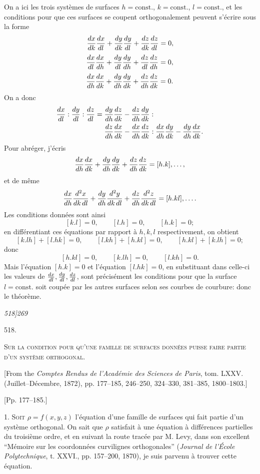 \documentclass[11pt]{article}
\newcommand{\phead}[3]{\noindent\textit{#1\hfill #2\hfill #3}\par\medskip}
\begin{document}
On a ici les trois syst\`emes de surfaces $h=\mathrm{const.}$, $k=\mathrm{const.}$,
$l=\mathrm{const.}$, et les conditions pour que ces surfaces se coupent orthogonalement
peuvent s'\'ecrire sous la forme
\[
{dx\over dk}{dx\over dl}+{dy\over dk}{dy\over dl}+{dz\over dk}{dz\over dl}=0,
\]
\[
{dx\over dl}{dx\over dh}+{dy\over dl}{dy\over dh}+{dz\over dl}{dz\over dh}=0,
\]
\[
{dx\over dh}{dx\over dk}+{dy\over dh}{dy\over dk}+{dz\over dh}{dz\over dk}=0.
\]
On a donc
\[
\begin{split}
{dx\over dl}:{dy\over dl}:{dz\over dl}={}&
{dy\over dh}{dz\over dk}-{dz\over dh}{dy\over dk}:\\
&{dz\over dh}{dx\over dk}-{dx\over dh}{dz\over dk}:
{dx\over dh}{dy\over dk}-{dy\over dh}{dx\over dk}.
\end{split}
\]
Pour abr\'eger, j'\'ecris
\[
{dx\over dh}{dx\over dk}+{dy\over dh}{dy\over dk}+{dz\over dh}{dz\over dk}=[h.k],\ldots,
\]
et de m\^eme
\[
{dx\over dh}{d^2x\over dk\,dl}+{dy\over dh}{d^2y\over dk\,dl}
+{dz\over dh}{d^2z\over dk\,dl}=[h.kl],\ldots .
\]
Les conditions donn\'ees sont ainsi
\[
[k.l]=0,\qquad [l.h]=0,\qquad [h.k]=0;
\]
en diff\'erentiant ces \'equations par rapport \`a $h,k,l$ respectivement, on obtient
\[
[k.lh]+[l.hk]=0,\qquad [l.kh]+[h.kl]=0,\qquad [h.kl]+[k.lh]=0;
\]
donc
\[
[h.kl]=0,\qquad [k.lh]=0,\qquad [l.kh]=0.
\]
Mais l'\'equation $[h.k]=0$ et l'\'equation $[l.hk]=0$, en substituant dans celle-ci les
valeurs de ${dx\over dl},{dy\over dl},{dz\over dl}$, sont pr\'ecis\'ement les conditions pour que
la surface $l=\mathrm{const.}$ soit coup\'ee par les autres surfaces selon ses courbes de
courbure: donc le th\'eor\`eme.

\clearpage

\phead{518]}{}{269}
\begin{center}
{\Large 518.}

\vspace{1.1cm}
{\large\scshape Sur la condition pour qu'une famille de surfaces donn\'ees puisse faire partie d'un syst\`eme orthogonal.}

\vspace{.7cm}
[From the \textit{Comptes Rendus de l'Acad\'emie des Sciences de Paris}, tom. LXXV.
(Juillet--D\'ecembre, 1872), pp. 177--185, 246--250, 324--330, 381--385, 1800--1803.]

\vspace{.5cm}
[Pp. 177--185.]
\end{center}

1. \textsc{Soit} $\rho=f(x,y,z)$ l'\'equation d'une famille de surfaces qui fait partie d'un
syst\`eme orthogonal. On sait que $\rho$ satisfait \`a une \'equation \`a diff\'erences partielles
du troisi\`eme ordre, et en suivant la route trac\'ee par M. Levy, dans son excellent
``M\'emoire sur les coordonn\'ees curvilignes orthogonales'' (\textit{Journal de l'\'Ecole
Polytechnique}, t. XXVI., pp. 157--200, 1870), je suis parvenu \`a trouver cette
\'equation.
\end{document}

